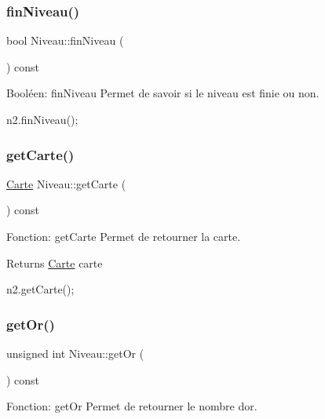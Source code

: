 \subsubsection{\texorpdfstring{fin\+Niveau()}{finNiveau()}}
{\footnotesize\ttfamily bool Niveau\+::fin\+Niveau (\begin{DoxyParamCaption}{ }\end{DoxyParamCaption}) const}



Booléen\+: fin\+Niveau Permet de savoir si le niveau est finie ou non. 


\begin{DoxyCode}
n2.finNiveau();
\end{DoxyCode}
 \mbox{\label{classNiveau_aa73cc05c792c580821b06e21e8eab4b1}} 
\subsubsection{\texorpdfstring{get\+Carte()}{getCarte()}}
{\footnotesize\ttfamily \hyperlink{classCarte}{Carte} Niveau\+::get\+Carte (\begin{DoxyParamCaption}{ }\end{DoxyParamCaption}) const}



Fonction\+: get\+Carte Permet de retourner la carte. 

\begin{DoxyReturn}{Returns}
\hyperlink{classCarte}{Carte} carte 
\begin{DoxyCode}
n2.getCarte();
\end{DoxyCode}
 
\end{DoxyReturn}
\mbox{\label{classNiveau_a2ec4d0acee314e00c509b603c580b13b}} 
\subsubsection{\texorpdfstring{get\+Or()}{getOr()}}
{\footnotesize\ttfamily unsigned int Niveau\+::get\+Or (\begin{DoxyParamCaption}{ }\end{DoxyParamCaption}) const}



Fonction\+: get\+Or Permet de retourner le nombre d\textquotesingle{}or. 

